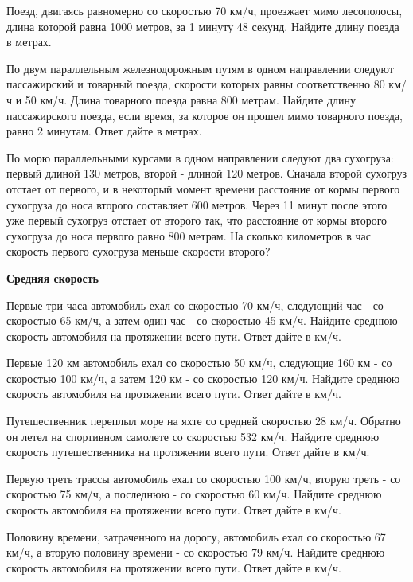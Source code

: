  Поезд, двигаясь равномерно со скоростью 70 км/ч, проезжает мимо лесополосы, длина которой равна 1000 метров, за 1 минуту 48 секунд. Найдите длину поезда в метрах.

\newpage
\hspace{3mm}

 По двум параллельным железнодорожным путям в одном направлении следуют пассажирский и товарный поезда, скорости которых равны соответственно 80 км/ч и 50 км/ч. Длина товарного поезда равна 800 метрам. Найдите длину пассажирского поезда, если время, за которое он прошел мимо товарного поезда, равно 2 минутам. Ответ дайте в метрах.

 По морю параллельными курсами в одном направлении следуют два сухогруза: первый длиной 130 метров, второй - длиной 120 метров. Сначала второй сухогруз отстает от первого, и в некоторый момент времени расстояние от кормы первого сухогруза до носа второго составляет 600 метров. Через 11 минут после этого уже первый сухогруз отстает от второго так, что расстояние от кормы второго сухогруза до носа первого равно 800 метрам. На сколько километров в час скорость первого сухогруза меньше скорости второго?


\centerline{\bf \Huge Средняя скорость}


 Первые три часа автомобиль ехал со скоростью 70 км/ч, следующий час - со скоростью 65 км/ч, а затем один час - со скоростью 45 км/ч. Найдите среднюю скорость автомобиля на протяжении всего пути. Ответ дайте в км/ч.

 Первые 120 км автомобиль ехал со скоростью 50 км/ч, следующие 160 км - со скоростью 100 км/ч, а затем 120 км - со скоростью 120 км/ч. Найдите среднюю скорость автомобиля на протяжении всего пути. Ответ дайте в км/ч.

 Путешественник переплыл море на яхте со средней скоростью 28 км/ч. Обратно он летел на спортивном самолете со скоростью 532 км/ч. Найдите среднюю скорость путешественника на протяжении всего пути. Ответ дайте в км/ч.

 Первую треть трассы автомобиль ехал со скоростью 100 км/ч, вторую треть - со скоростью 75 км/ч, а последнюю - со скоростью 60 км/ч. Найдите среднюю скорость автомобиля на протяжении всего пути. Ответ дайте в км/ч.

 Половину времени, затраченного на дорогу, автомобиль ехал со скоростью 67 км/ч, а вторую половину времени - со скоростью 79 км/ч. Найдите среднюю скорость автомобиля на протяжении всего пути. Ответ дайте в км/ч.
